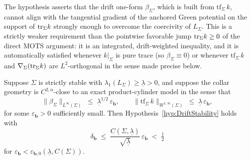 \begin{remark}
The hypothesis asserts that the drift one-form $\beta_\Sigma$, which is built from $\mathrm{tf}_\Sigma\,k$, cannot align with the tangential gradient of the anchored Green potential on the support of $\mathrm{tr}_\Sigma k$ strongly enough to overcome the coercivity of $L_\Sigma$. This is a strictly weaker requirement than the pointwise favorable jump $\mathrm{tr}_\Sigma k\ge0$ of the direct MOTS argument: it is an integrated, drift-weighted inequality, and it is automatically satisfied whenever $k|_\Sigma$ is pure trace (so $\beta_\Sigma\equiv0$) or whenever $\mathrm{tf}_\Sigma\,k$ and $\nabla_\Sigma(\mathrm{tr}_\Sigma k)$ are $L^2$-orthogonal in the sense made precise below.
\end{remark}

\begin{theorem}\label{thm:PerturbativeDriftStability}
Suppose $\Sigma$ is strictly stable with $\lambda_1(L_\Sigma)\ge\underline\lambda>0$, and suppose the collar geometry is $C^{2,\alpha}$-close to an exact product-cylinder model in the sense that
\begin{equation}\label{eq:CollarSmallness}
    \|\beta_\Sigma\|_{L^\infty(\Sigma)}
    \;\le\;
    \underline\lambda^{1/2}\,\varepsilon_{\mathbf b},
    \qquad
    \|\mathrm{tf}_\Sigma\,k\|_{W^{1,\infty}(\Sigma)}
    \;\le\;
    \underline\lambda\,\varepsilon_{\mathbf b},
\end{equation}
for some $\varepsilon_{\mathbf b}>0$ sufficiently small. Then Hypothesis~\ref{hyp:DriftStability} holds with
\begin{equation}\label{eq:PerturbativeDeltaB}
    \delta_{\mathbf b}
    \;\le\;
    \frac{C(\Sigma,\underline\lambda)}{\sqrt{\underline\lambda}}\,\varepsilon_{\mathbf b}
    \;<\;\tfrac12
\end{equation}
for $\varepsilon_{\mathbf b}<\varepsilon_{\mathbf b,0}(\underline\lambda,C(\Sigma))$.
\end{theorem}

